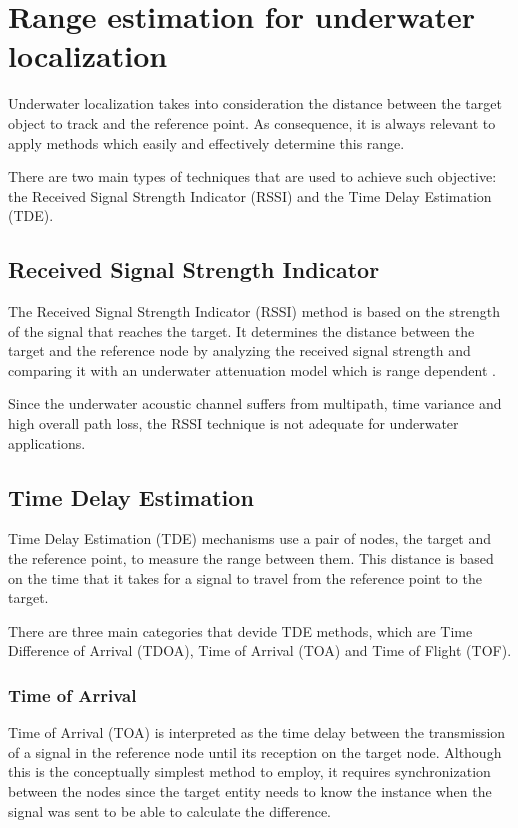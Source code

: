 
\section{Range estimation for underwater localization}

Underwater localization takes into consideration the distance between the target object to track and the reference point. As consequence, it is always relevant to apply methods which easily and effectively determine this range.

There are two main types of techniques that are used to achieve such objective: the Received Signal Strength Indicator (RSSI) and the Time Delay Estimation (TDE).


\subsection{Received Signal Strength Indicator}

The Received Signal Strength Indicator (RSSI) method is based on the strength of the signal that reaches the target. It determines the distance between the target and the reference node by analyzing the received signal strength and comparing it with an underwater attenuation model which is range dependent \cite{ocean-acoust}. 

Since the underwater acoustic channel suffers from multipath, time variance and high overall path loss, the RSSI technique is not adequate for underwater applications.

\subsection{Time Delay Estimation}
Time Delay Estimation (TDE) mechanisms use a pair of nodes, the target and the reference point, to measure the range between them. This distance is based on the time that it takes for a signal to travel from the reference point to the target.

There are three main categories that devide TDE methods, which are Time Difference of Arrival (TDOA), Time of Arrival (TOA) and Time of Flight (TOF).

\subsubsection{Time of Arrival}

Time of Arrival (TOA) is interpreted as the time delay between the transmission of a signal in the reference node until its reception on the target node. Although this is the conceptually simplest method to employ, it requires synchronization between the nodes since the target entity needs to know the instance when the signal was sent to be able to calculate the difference.

